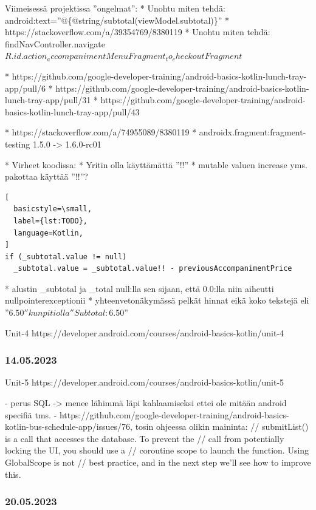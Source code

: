 Viimeisessä projektissa ''ongelmat'':
* Unohtu miten tehdä: android:text=''@\{@string/subtotal(viewModel.subtotal)\}''
  * https://stackoverflow.com/a/39354769/8380119
* Unohtu miten tehdä: findNavController\(\).navigate\(R.id.action_accompanimentMenuFragment_to_checkoutFragment\)

* https://github.com/google-developer-training/android-basics-kotlin-lunch-tray-app/pull/6
* https://github.com/google-developer-training/android-basics-kotlin-lunch-tray-app/pull/31
* https://github.com/google-developer-training/android-basics-kotlin-lunch-tray-app/pull/43

* https://stackoverflow.com/a/74955089/8380119
* androidx.fragment:fragment-testing 1.5.0 -> 1.6.0-rc01

* Virheet koodissa:
  * Yritin olla käyttämättä ''!!''
    * mutable valuen increase yms. pakottaa käyttää ''!!''?

\begin{lstlisting}[
  basicstyle=\small,
  label={lst:TODO},
  language=Kotlin,
]
if (_subtotal.value != null)
  _subtotal.value = _subtotal.value!! - previousAccompanimentPrice
\end{lstlisting}

  * alustin \_subtotal ja \_total null:lla sen sijaan, että 0.0:lla niin aiheutti nullpointerexceptionii
  * yhteenvetonäkymässä pelkät hinnat eikä koko tekstejä eli ''$6.50'' kun piti olla ''Subtotal: $6.50''

Unit-4 https://developer.android.com/courses/android-basics-kotlin/unit-4

\subsubsection{14.05.2023}

Unit-5 https://developer.android.com/courses/android-basics-kotlin/unit-5

- perus SQL -> menee lähimmä läpi kahlaamiseksi ettei ole mitään android specifiä tms.
- https://github.com/google-developer-training/android-basics-kotlin-bus-schedule-app/issues/76, tosin ohjeessa olikin maininta:
// submitList() is a call that accesses the database. To prevent the
// call from potentially locking the UI, you should use a
// coroutine scope to launch the function. Using GlobalScope is not
// best practice, and in the next step we'll see how to improve this.

\subsubsection{20.05.2023}

